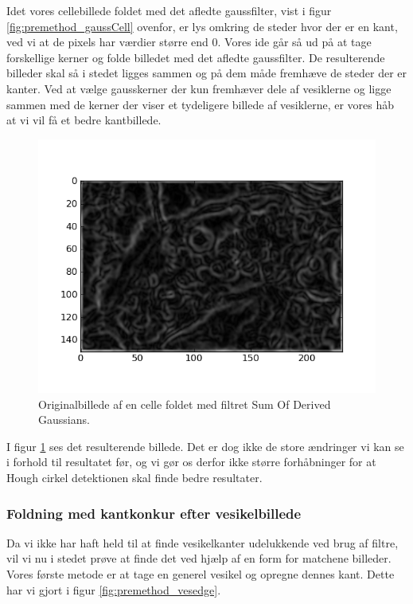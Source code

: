 Idet vores cellebillede foldet med det afledte gaussfilter, vist i figur \ref{fig:premethod_gaussCell} ovenfor, er lys omkring de steder hvor der er en kant, ved vi at de pixels har værdier større end 0. Vores ide går så ud på at tage forskellige kerner og folde billedet med det afledte gaussfilter. De resulterende billeder skal så i stedet ligges sammen og på dem måde fremhæve de steder der er kanter. Ved at vælge gausskerner der kun fremhæver dele af vesiklerne og ligge sammen med de kerner der viser et tydeligere billede af vesiklerne, er vores håb at vi vil få et bedre kantbillede.

\begin{figure}[H]
	\centering
	\includegraphics[scale=0.8]{files/premethod/img/sum_der_gauss.png}
	\caption{Originalbillede af en celle foldet med filtret Sum Of Derived Gaussians.\label{fig:premethod_sumOfDiff}}
\end{figure}

I figur \ref{fig:premethod_sumOfDiff} ses det resulterende billede. Det er dog ikke de store ændringer vi kan se i forhold til resultatet før, og vi gør os derfor ikke større forhåbninger for at Hough cirkel detektionen skal finde bedre resultater.

\subsubsection{Foldning med kantkonkur efter vesikelbillede}
Da vi ikke har haft held til at finde vesikelkanter udelukkende ved brug af filtre, vil vi nu i stedet prøve at finde det ved hjælp af en form for matchene billeder. Vores første metode er at tage en generel vesikel og opregne dennes kant. Dette har vi gjort i figur \ref{fig:premethod_vesedge}. 

